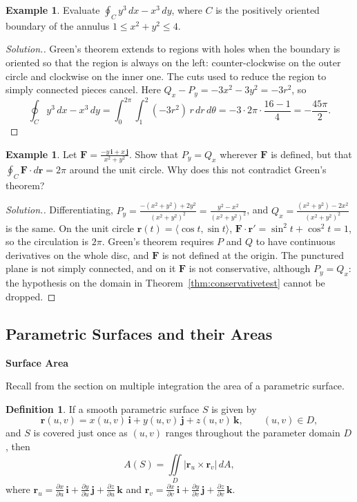 \documentclass[11pt,a4paper]{article}
\theoremstyle{definition}
\newtheorem{defn}[thm]{Definition}
\newtheorem{exa}[thm]{Example}
\newenvironment{solution}
  {\renewcommand{\qedsymbol}{}\begin{proof}[\textit{Solution}.]}
  {\end{proof}}
\newcommand{\subhead}[1]{%
  \par\medskip\noindent\textbf{#1}\par\nobreak\smallskip}
\begin{document}
\begin{exa}
\label{ex:greenannulus}
Evaluate $\oint_C y^3\,dx - x^3\,dy$, where $C$ is the positively oriented
boundary of the annulus $1\leq x^2 + y^2\leq 4$.
\end{exa}

\begin{solution}
Green's theorem extends to regions with holes when the boundary is oriented so
that the region is always on the left: counter-clockwise on the outer circle and
clockwise on the inner one. The cuts used to reduce the region to simply
connected pieces cancel. Here $Q_x - P_y = -3x^2 - 3y^2 = -3r^2$, so
\[\oint_C y^3\,dx - x^3\,dy = \int_0^{2\pi}\int_1^2 (-3r^2)\,r\,dr\,d\theta =
-3\cdot 2\pi\cdot\frac{16 - 1}{4} = -\frac{45\pi}{2} .\]
\end{solution}

\begin{exa}
\label{ex:greenwinding}
Let $\mathbf F = \frac{-y\,\mathbf i + x\,\mathbf j}{x^2 + y^2}$. Show that
$P_y = Q_x$ wherever $\mathbf F$ is defined, but that
$\oint_C\mathbf F\cdot d\mathbf r = 2\pi$ around the unit circle. Why does this
not contradict Green's theorem?
\end{exa}

\begin{solution}
Differentiating, $P_y = \frac{-(x^2+y^2) + 2y^2}{(x^2+y^2)^2} =
\frac{y^2 - x^2}{(x^2+y^2)^2}$, and $Q_x = \frac{(x^2 + y^2) - 2x^2}{(x^2 +
y^2)^2}$ is the same. On the unit circle $\mathbf r(t) = \langle\cos t,\sin
t\rangle$, $\mathbf F\cdot\mathbf r' = \sin^2t + \cos^2t = 1$, so the
circulation is $2\pi$. Green's theorem requires $P$ and $Q$ to have continuous
derivatives on the whole disc, and $\mathbf F$ is not defined at the origin. The
punctured plane is not simply connected, and on it $\mathbf F$ is not
conservative, although $P_y = Q_x$: the hypothesis on the domain in
Theorem~\ref{thm:conservativetest} cannot be dropped.
\end{solution}

{\color[wave]{485}\subsection{Parametric Surfaces and their Areas}}

\subhead{Surface Area}

Recall from the section on multiple integration the area of a parametric
surface.

\begin{defn}
\label{defn:surfacearea2}
If a smooth parametric surface $S$ is given by
\[\mathbf r(u,v) = x(u,v)\,\mathbf i + y(u,v)\,\mathbf j + z(u,v)\,\mathbf k ,
\qquad (u,v)\in D ,\]
and $S$ is covered just once as $(u,v)$ ranges throughout the parameter domain
$D$, then
\[A(S) = \iint\limits_D|\mathbf r_u \times \mathbf r_v|\,dA ,\]
where $\mathbf r_u = \frac{\partial x}{\partial u}\,\mathbf i + \frac{\partial
y}{\partial u}\,\mathbf j + \frac{\partial z}{\partial u}\,\mathbf k$ and
$\mathbf r_v = \frac{\partial x}{\partial v}\,\mathbf i + \frac{\partial
y}{\partial v}\,\mathbf j + \frac{\partial z}{\partial v}\,\mathbf k$.
\end{defn}
\end{document}
